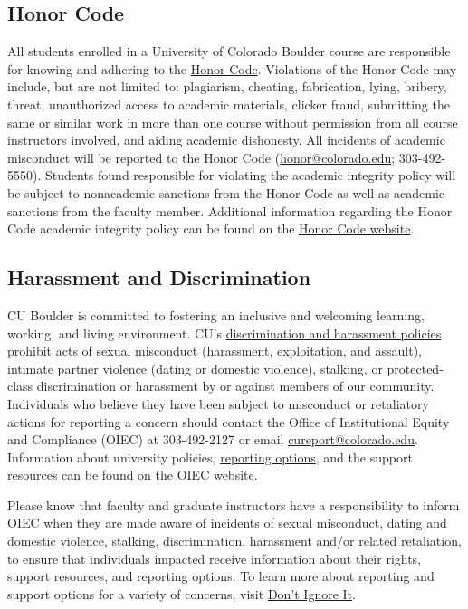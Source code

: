 \documentclass[11pt]{memoir}
\begin{document}
\subsection{Honor Code}
All students enrolled in a University of Colorado Boulder course are responsible for knowing and adhering to the \href{http://www.colorado.edu/policies/academic-integrity-policy}{Honor Code}. Violations of the Honor Code may include, but are not limited to: plagiarism, cheating, fabrication, lying, bribery, threat, unauthorized access to academic materials, clicker fraud, submitting the same or similar work in more than one course without permission from all course instructors involved, and aiding academic dishonesty. All incidents of academic misconduct will be reported to the Honor Code (\href{mailto:honor@colorado.edu}{honor@colorado.edu}; 303-492-5550). Students found responsible for violating the academic integrity policy will be subject to nonacademic sanctions from the Honor Code as well as academic sanctions from the faculty member. Additional information regarding the Honor Code academic integrity policy can be found on the \href{http://honorcode.colorado.edu}{Honor Code website}.

\subsection{Harassment and Discrimination}
CU Boulder is committed to fostering an inclusive and welcoming learning, working, and living environment. CU's \href{http://www.colorado.edu/policies/discrimination-and-harassment-policy-and-procedures}{discrimination and harassment policies} prohibit acts of sexual misconduct (harassment, exploitation, and assault), intimate partner violence (dating or domestic violence), stalking, or protected-class discrimination or harassment by or against members of our community. Individuals who believe they have been subject to misconduct or retaliatory actions for reporting a concern should contact the Office of Institutional Equity and Compliance (OIEC) at 303-492-2127 or email \href{mailto:cureport@colorado.edu}{cureport@colorado.edu}. Information about university policies, \href{https://www.colorado.edu/oiec/reporting-resolutions/making-report}{reporting options}, and the support resources can be found on the \href{http://www.colorado.edu/institutionalequity/}{OIEC website}.

Please know that faculty and graduate instructors have a responsibility to inform OIEC when they are made aware of incidents of sexual misconduct, dating and domestic violence, stalking, discrimination, harassment and/or related retaliation, to ensure that individuals impacted receive information about their rights, support resources, and reporting options. To learn more about reporting and support options for a variety of concerns, visit \href{https://www.colorado.edu/dontignoreit/}{Don't Ignore It}.
\end{document}
